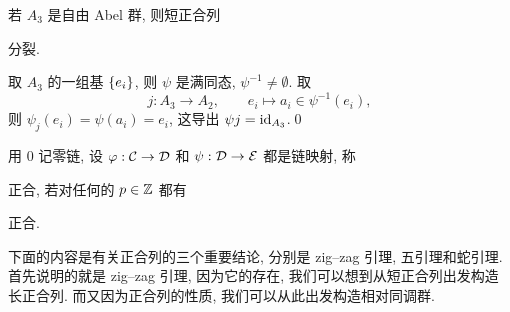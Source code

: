 \begin{Corollary}
	若 $ A_3 $ 是自由 Abel 群, 则短正合列
	\begin{center}
	\end{center}
	分裂.
\end{Corollary}
\begin{Proof}
	取 $ A_3 $ 的一组基 $ \left\{ e_i \right\} $, 则 $ \psi $ 是满同态, $ \psi^{-1}\ne\emptyset $. 取
	\[
		j : A_3\to A_2,\qquad e_i\mapsto a_i\in\psi^{-1}(e_i),
	\]
	则 $ \psi_j(e_i)=\psi(a_i)=e_i $, 这导出 $ \psi j=\mathrm{id}_{A_3} $.\qed
\end{Proof}

\begin{Definition}[链复形的短正合列]
	用 $ 0 $ 记零链, 设 $ \varphi : \mathcal{C}\to\mathcal{D} $ 和 $ \psi : \mathcal{D}\to\mathcal{E} $ 都是链映射, 称
	\begin{center}
	\end{center}
	正合, 若对任何的 $ p\in\mathbb{Z} $ 都有
	\begin{center}
	\end{center}
	正合.
\end{Definition}

下面的内容是有关正合列的三个重要结论, 分别是 zig--zag 引理, 五引理和蛇引理. 首先说明的就是 zig--zag 引理, 因为它的存在, 我们可以想到从短正合列出发构造长正合列. 而又因为正合列的性质, 我们可以从此出发构造相对同调群.

